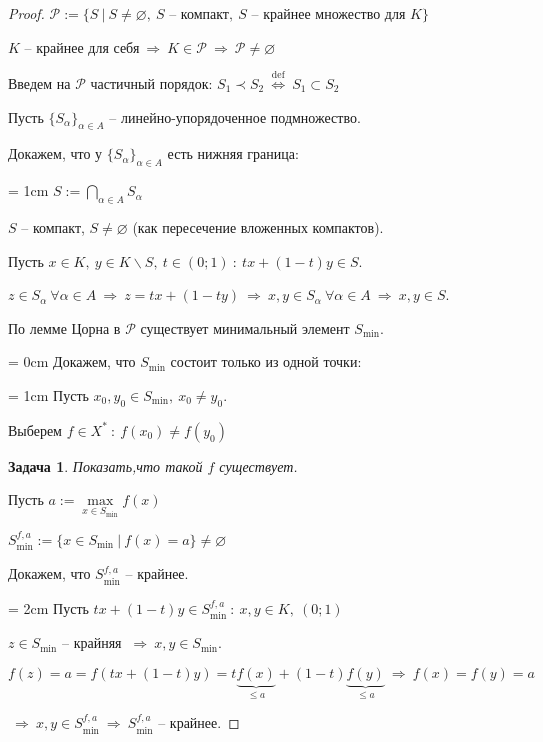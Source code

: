 \documentclass[12pt,a4paper]{report}
\newcommand{\then}{\ \Longrightarrow \ }
\newcommand{\iaoi}{\ \Longleftrightarrow \ }
\newcommand{\empt}{\varnothing}
\newtheorem{exer}{Задача}
\begin{document}
\begin{proof}

$ \mathcal{P} := \{ S \ \big| \ S \neq \empt, \ S \text{ -- компакт}, \ S \text{ -- крайнее множество для } K\}$

$K$ -- крайнее для себя$\then K \in  \mathcal{P} \then  \mathcal{P} \neq \empt$

Введем на $\mathcal{P}$ частичный порядок: $S_1 \prec S_2 \overset{\text{def}}{\iaoi} S_1 \subset S_2$

Пусть $\{ S_\alpha \}_{\alpha \in A}$ -- линейно-упорядоченное подмножество.

Докажем, что у $\{ S_\alpha \}_{\alpha \in A}$ есть нижняя граница:

\parindent = 1cm
$S := \bigcap\limits_{\alpha \in A} S_\alpha$

$S$ -- компакт, $S \neq \empt$ (как пересечение вложенных компактов).

Пусть $x \in K, \ y \in K \smallsetminus S , \ t \in (0;1) \ : \ tx+(1-t)y \in S$.

$z \in S_\alpha \ \forall \alpha \in A \then z = tx + (1-ty) \then x,y \in S_\alpha \ \forall \alpha \in A \then x,y \in S$.

По лемме Цорна в $\mathcal{P}$ существует минимальный элемент $S_{\text{min}}$.

\parindent = 0cm
Докажем, что $S_{\text{min}}$ состоит только из одной точки:

\parindent = 1cm
Пусть $x_0,y_0 \in S_{\text{min}}, \ x_0 \neq y_0$.

Выберем $f \in X^* \ : \ f(x_0) \neq f(y_0)$

\begin{exer}
Показать,что такой $f$ существует.
\end{exer}

Пусть $a := \max\limits_{x \in S_{\text{min}}} f(x)$

$S_{\text{min}}^{f,a} := \{ x \in S_{\text{min}} \ \big| \ f(x) = a \} \neq \empt$

Докажем, что $S_{\text{min}}^{f,a}$ -- крайнее.

\parindent = 2cm
Пусть $t x + (1-t)y \in S_{\text{min}}^{f,a} \ : \ x,y \in K, \ (0;1)$

$z \in S_{\text{min}}$ -- крайняя $\then x,y \in S_{\text{min}}$.

$f(z) = a = f(tx+(1-t)y) = t\underbrace{f(x)}_{\le a}+(1-t)\underbrace{f(y)}_{\le a} \then f(x) = f(y) = a$

$\then x,y \in S_{\text{min}}^{f,a} \then S_{\text{min}}^{f,a}$ -- крайнее.


\end{proof}
\end{document}

